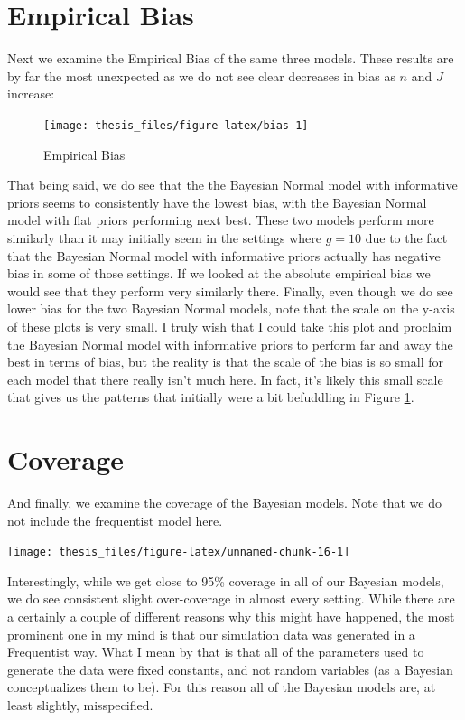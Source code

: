 \documentclass[12pt,twoside]{reedthesis}
\begin{document}
\hypertarget{empirical-bias}{%
\section{Empirical Bias}\label{empirical-bias}}

Next we examine the Empirical Bias of the same three models. These results are by far the most unexpected as we do not see clear decreases in bias as \(n\) and \(J\) increase:
\begin{figure}

{\centering \texttt{[image: thesis\_files/figure-latex/bias-1]} 

}

\caption{Empirical Bias}\label{fig:bias}
\end{figure}
That being said, we do see that the the Bayesian Normal model with informative priors seems to consistently have the lowest bias, with the Bayesian Normal model with flat priors performing next best. These two models perform more similarly than it may initially seem in the settings where \(g = 10\) due to the fact that the Bayesian Normal model with informative priors actually has negative bias in some of those settings. If we looked at the absolute empirical bias we would see that they perform very similarly there. Finally, even though we do see lower bias for the two Bayesian Normal models, note that the scale on the y-axis of these plots is very small. I truly wish that I could take this plot and proclaim the Bayesian Normal model with informative priors to perform far and away the best in terms of bias, but the reality is that the scale of the bias is so small for each model that there really isn't much here. In fact, it's likely this small scale that gives us the patterns that initially were a bit befuddling in Figure \ref{fig:bias}.

\hypertarget{coverage}{%
\section{Coverage}\label{coverage}}

And finally, we examine the coverage of the Bayesian models. Note that we do not include the frequentist model here.
\begin{center}\texttt{[image: thesis\_files/figure-latex/unnamed-chunk-16-1]} \end{center}

Interestingly, while we get close to 95\% coverage in all of our Bayesian models, we do see consistent slight over-coverage in almost every setting. While there are a certainly a couple of different reasons why this might have happened, the most prominent one in my mind is that our simulation data was generated in a Frequentist way. What I mean by that is that all of the parameters used to generate the data were fixed constants, and not random variables (as a Bayesian conceptualizes them to be). For this reason all of the Bayesian models are, at least slightly, misspecified.
\end{document}
